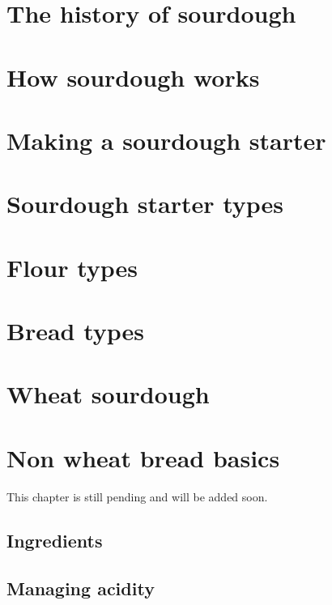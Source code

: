 \documentclass[a4paper, 12pt]{book}
\begin{document}
\mainmatter

\chapter{The history of sourdough}


\chapter{How sourdough works}


\chapter{Making a sourdough starter}


\chapter{Sourdough starter types}


\chapter{Flour types}


\chapter{Bread types}


\chapter{Wheat sourdough}
\label{chapter:wheat-sourdough}


\chapter{Non wheat bread basics}
This chapter is still pending and will be added soon.

\label{chapter:non-wheat-sourdough}
\section{Ingredients}
\section{Managing acidity}
\end{document}
